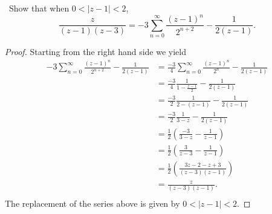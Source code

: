 \documentclass[11pt]{amsart}
\theoremstyle{definition}
\numberwithin{theorem}{section}
\numberwithin{definition}{section}
\numberwithin{equation}{section}
\begin{document}
\medskip {}\ Show that when $0 < |z-1| < 2$,
\begin{equation*}
 	\frac{z}{(z-1)(z-3)} = -3 \sum_{n=0}^\infty \frac{(z-1)^n}{2^{n+2}} - \frac{1}{2(z-1)}.
 \end{equation*} 
 \begin{proof}
 	Starting from the right hand side we yield \begin{equation*}
 		\begin{aligned}
 			-3 \sum_{n=0}^\infty \frac{(z-1)^n}{2^{n+2}} - \frac{1}{2(z-1)} &= \frac{-3}{4} \sum_{n=0}^\infty \frac{(z-1)^n}{2^{n}} - \frac{1}{2(z-1)} \\
 			&=  \frac{-3}{4} \frac{1}{1 - \frac{z-1}{2}}- \frac{1}{2(z-1)} \\
 			&=  \frac{-3}{2} \frac{1}{2 - (z-1)}- \frac{1}{2(z-1)} \\
 			&=  \frac{-3}{2} \frac{1}{3 - z}- \frac{1}{2(z-1)} \\
 			&=  \frac{1}{2} \left(\frac{-3}{3 - z}- \frac{1}{z-1}\right) \\
 			&=  \frac{1}{2} \left(\frac{3}{z-3}- \frac{1}{z-1}\right) \\
 			&=  \frac{1}{2} \left(\frac{3z-2 -z + 3}{(z-3)(z-1)}\right)\\
 			&= \frac{z}{(z-3)(z-1)}.\\
 		\end{aligned}
 	\end{equation*}
 	The replacement of the series above is given by $0 < |z-1| < 2.$
 \end{proof}
\end{document}
